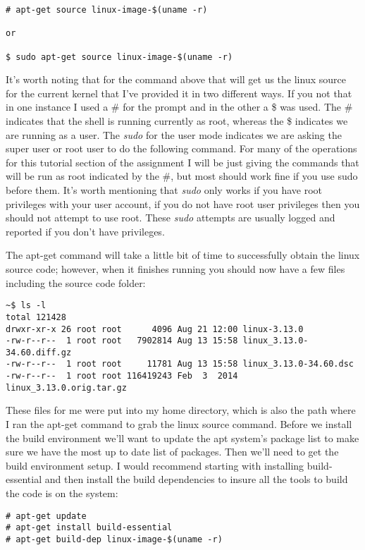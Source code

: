 \documentclass[11pt]{article}
\begin{document}
\begin{verbatim}
# apt-get source linux-image-$(uname -r)

or

$ sudo apt-get source linux-image-$(uname -r)
\end{verbatim}

It's worth noting that for the command above that will get us the linux source for the current kernel that I've provided it in two different ways. If you not that in one instance I used a \# for the prompt and in the other a \$ was used. The \# indicates that the shell is running currently as root, whereas the \$ indicates we are running as a user. The \emph{sudo} for the user mode indicates we are asking the super user or root user to do the following command. For many of the operations for this tutorial section of the assignment I will be just giving the commands that will be run as root indicated by the \#, but most should work fine if you use sudo before them. It's worth mentioning that \emph{sudo} only works if you have root privileges with your user account, if you do not have root user privileges then you should not attempt to use root. These \emph{sudo} attempts are usually logged and reported if you don't have privileges. 

The apt-get command will take a little bit of time to successfully obtain the linux source code; however, when it finishes running you should now have a few files including the source code folder:

\begin{verbatim}
~$ ls -l
total 121428
drwxr-xr-x 26 root root      4096 Aug 21 12:00 linux-3.13.0
-rw-r--r--  1 root root   7902814 Aug 13 15:58 linux_3.13.0-34.60.diff.gz
-rw-r--r--  1 root root     11781 Aug 13 15:58 linux_3.13.0-34.60.dsc
-rw-r--r--  1 root root 116419243 Feb  3  2014 linux_3.13.0.orig.tar.gz
\end{verbatim}

These files for me were put into my home directory, which is also the path where I ran the apt-get command to grab the linux source command. Before we install the build environment we'll want to update the apt system's package list to make sure we have the most up to date list of packages. Then we'll need to get the build environment setup. I would recommend starting with installing build-essential and then install the build dependencies to insure all the tools to build the code is on the system:

\begin{verbatim}
# apt-get update
# apt-get install build-essential
# apt-get build-dep linux-image-$(uname -r)
\end{verbatim}
\end{document}
